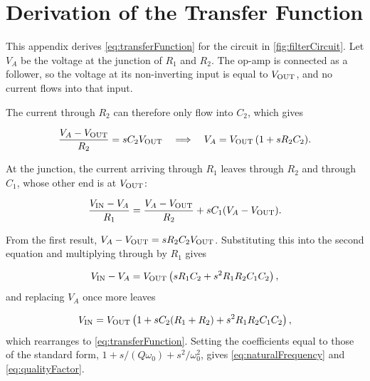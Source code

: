 
\section{Derivation of the Transfer Function}
\label{app:derivation}

This appendix derives \cref{eq:transferFunction} for the circuit in
\cref{fig:filterCircuit}. Let $V_A$ be the voltage at the junction of $R_1$
and $R_2$. The op-amp is connected as a follower, so the voltage at its
non-inverting input is equal to $V_{\text{OUT}}$, and no current flows into that input.

The current through $R_2$ can therefore only flow into $C_2$, which gives

\begin{equation}
  \frac{V_A - V_{\text{OUT}}}{R_2} = s C_2 V_{\text{OUT}}
  \quad\Longrightarrow\quad
  V_A = V_{\text{OUT}}\,(1 + s R_2 C_2).
\end{equation}

At the junction, the current arriving through $R_1$ leaves through $R_2$ and
through $C_1$, whose other end is at $V_{\text{OUT}}$:

\begin{equation}
  \frac{V_{\text{IN}} - V_A}{R_1} = \frac{V_A - V_{\text{OUT}}}{R_2} + s C_1 (V_A - V_{\text{OUT}}).
\end{equation}

From the first result, $V_A - V_{\text{OUT}} = s R_2 C_2 V_{\text{OUT}}$. Substituting this into
the second equation and multiplying through by $R_1$ gives

\begin{equation}
  V_{\text{IN}} - V_A = V_{\text{OUT}} \left( s R_1 C_2 + s^2 R_1 R_2 C_1 C_2 \right),
\end{equation}
and replacing $V_A$ once more leaves

\begin{equation}
  V_{\text{IN}} = V_{\text{OUT}} \left( 1 + s C_2 (R_1 + R_2) + s^2 R_1 R_2 C_1 C_2 \right),
\end{equation}
which rearranges to \cref{eq:transferFunction}. Setting the coefficients equal
to those of the standard form,
$1 + s/(Q\omega_0) + s^2/\omega_0^2$, gives \cref{eq:naturalFrequency} and
\cref{eq:qualityFactor}.
